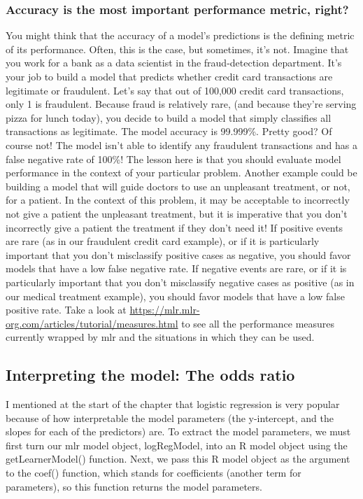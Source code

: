 \documentclass[
]{article}
\begin{document}
\subsubsection{Accuracy is the most important performance metric,
right?}\label{accuracy-is-the-most-important-performance-metric-right}

You might think that the accuracy of a model's predictions is the
defining metric of its performance. Often, this is the case, but
sometimes, it's not. Imagine that you work for a bank as a data
scientist in the fraud-detection department. It's your job to build a
model that predicts whether credit card transactions are legitimate or
fraudulent. Let's say that out of 100,000 credit card transactions, only
1 is fraudulent. Because fraud is relatively rare, (and because they're
serving pizza for lunch today), you decide to build a model that simply
classifies all transactions as legitimate. The model accuracy is
99.999\%. Pretty good? Of course not! The model isn't able to identify
any fraudulent transactions and has a false negative rate of 100\%! The
lesson here is that you should evaluate model performance in the context
of your particular problem. Another example could be building a model
that will guide doctors to use an unpleasant treatment, or not, for a
patient. In the context of this problem, it may be acceptable to
incorrectly not give a patient the unpleasant treatment, but it is
imperative that you don't incorrectly give a patient the treatment if
they don't need it! If positive events are rare (as in our fraudulent
credit card example), or if it is particularly important that you don't
misclassify positive cases as negative, you should favor models that
have a low false negative rate. If negative events are rare, or if it is
particularly important that you don't misclassify negative cases as
positive (as in our medical treatment example), you should favor models
that have a low false positive rate. Take a look at
\url{https://mlr.mlr-org.com/articles/tutorial/measures.html} to see all
the performance measures currently wrapped by mlr and the situations in
which they can be used.

\subsection{Interpreting the model: The odds
ratio}\label{interpreting-the-model-the-odds-ratio}

I mentioned at the start of the chapter that logistic regression is very
popular because of how interpretable the model parameters (the
y-intercept, and the slopes for each of the predictors) are. To extract
the model parameters, we must first turn our mlr model object,
logRegModel, into an R model object using the getLearnerModel()
function. Next, we pass this R model object as the argument to the
coef() function, which stands for coefficients (another term for
parameters), so this function returns the model parameters.
\end{document}
